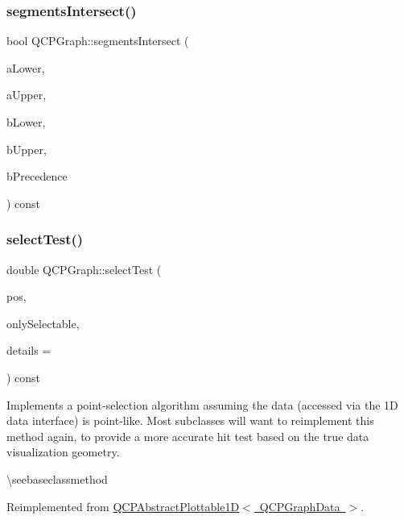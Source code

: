 \subsubsection{\texorpdfstring{segmentsIntersect()}{segmentsIntersect()}}
{\footnotesize\ttfamily bool Q\+C\+P\+Graph\+::segments\+Intersect (\begin{DoxyParamCaption}\item[{double}]{a\+Lower,  }\item[{double}]{a\+Upper,  }\item[{double}]{b\+Lower,  }\item[{double}]{b\+Upper,  }\item[{int \&}]{b\+Precedence }\end{DoxyParamCaption}) const\hspace{0.3cm}{\ttfamily [protected]}}

\mbox{\label{class_q_c_p_graph_a6d669d04462d272c6aa0e5f85846d673}} 
\subsubsection{\texorpdfstring{selectTest()}{selectTest()}}
{\footnotesize\ttfamily double Q\+C\+P\+Graph\+::select\+Test (\begin{DoxyParamCaption}\item[{const Q\+PointF \&}]{pos,  }\item[{bool}]{only\+Selectable,  }\item[{Q\+Variant $\ast$}]{details = {} }\end{DoxyParamCaption}) const\hspace{0.3cm}{\ttfamily [virtual]}}

Implements a point-\/selection algorithm assuming the data (accessed via the 1D data interface) is point-\/like. Most subclasses will want to reimplement this method again, to provide a more accurate hit test based on the true data visualization geometry.

\textbackslash{}seebaseclassmethod 

Reimplemented from \mbox{\hyperlink{class_q_c_p_abstract_plottable1_d_a4611b43bcb6441b2154eb4f4e0a33db2}{Q\+C\+P\+Abstract\+Plottable1\+D$<$ Q\+C\+P\+Graph\+Data $>$}}.

\mbox{\label{class_q_c_p_graph_ab468cd600160f327836aa0644291e64c}} 
